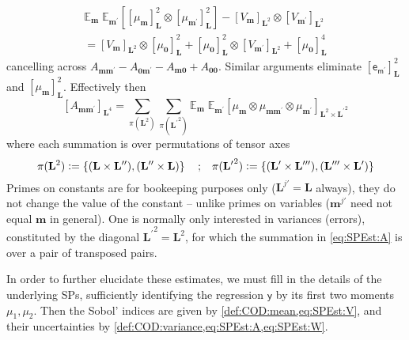 \documentclass[preprint,12pt]{elsarticle}
\newcommand*{\M}[1]{\ensuremath{#1}\xspace}
\newcommand*{\x}{\times}
\newcommand*{\mi}[1]{\mathbf{#1}}
\newcommand*{\rv}[1]{\mathsf{#1}}
\newcommand*{\te}[2][]{\left\lbrack{#2}\right\rbrack_{#1}}
\newcommand*{\deq}{\M{\mathrel{\mathop:}=}}
\newcommand{\T}[1]{\text{#1}}
\newcommand*{\QT}[2][]{\M{\quad\T{#2}\ifthenelse{\equal{#1}{}}{\quad}{#1}}}
\newcommand*{\ev}[3][]{\mathbb{E}_{#3}^{#1}\!\left\lbrack{#2}\right\rbrack}
\newcommand*{\evt}[3][]{\mathbb{E}_{#3}^{#1}\!#2}
\newcommand*{\set}[1]{\M{\left\lbrace{#1}\right\rbrace}}
\begin{document}
    \begin{multline*}
        \evt{\;\ev{\te[\mi{L}]{\mu_{\mi{m}}}^{2} \otimes \te[\mi{L}]{\mu_{\mi{m^{\prime}}}}^{2}}{\mi{m^{\prime}}}}{\mi{m}}
        - \te[\mi{L}^2]{V_{\mi{m}}}\otimes \te[\mi{L}^2]{V_{\mi{m^{\prime}}}} \\
        = \te[\mi{L}^2]{V_{\mi{m}}}\otimes \te[\mi{L}]{\mu_{\mi{0}}}^{2}
        + \te[\mi{L}]{\mu_{\mi{0}}}^{2}\otimes \te[\mi{L}^2]{V_{\mi{m^{\prime}}}}
        + \te[\mi{L}]{\mu_{\mi{0}}}^{4}
    \end{multline*}
    cancelling across $A_{\mi{mm^{\prime}}}-A_{\mi{0m^{\prime}}} - A_{\mi{m0}}+A_{\mi{00}}$.
    Similar arguments eliminate $\te[\mi{L}]{\rv{e_{m^{\prime}}}}^{2}$ and $\te[\mi{L}]{\mu_{\mi{m}}}^{2}$.
    Effectively then
    \begin{equation}\label{eq:SPEst:A}
        \te[\mi{L}^4]{A_{\mi{mm^{\prime}}}} = \sum_{\pi(\mi{L}^{2})} \sum_{\pi(\mi{L^{\prime}}^{2})}
        \evt{\;\evt{\te[\mi{L}^{2} \x \mi{L^{\prime}}^{2}]{\mu_{\mi{m}} \otimes \mu_{\mi{mm^{\prime}}} \otimes \mu_{\mi{m^{\prime}}}}}{\mi{m^{\prime}}}}{\mi{m}}
    \end{equation}
    where each summation is over permutations of tensor axes
    \begin{equation*}
        \pi(\mi{L}^{2}) \deq \set{(\mi{L}\x\mi{L^{\prime\prime}}), (\mi{L^{\prime\prime}}\x\mi{L})} \QT{;} \pi(\mi{L^{\prime}}^{2}) \deq \set{(\mi{L^{\prime}}\x\mi{L^{\prime\prime\prime}}), (\mi{L^{\prime\prime\prime}}\x\mi{L^{\prime}})}
    \end{equation*}
    Primes on constants are for bookeeping purposes only ($\mi{L}^{j\prime} = \mi{L}$ always), they do not change the value of the constant -- unlike primes on variables ($\mi{m}^{j\prime}$ need not equal $\mi{m}$ in general). One is normally only interested in variances (errors), constituted by the diagonal $\mi{L^{\prime}}^{2}=\mi{L}^{2}$, for which the summation in \cref{eq:SPEst:A} is over a pair of transposed pairs.

    In order to further elucidate these estimates, we must fill in the details of the underlying SPs, sufficiently identifying the regression $\rv{y}$ by its first two moments $\mu_{1}, \mu_{2}$. Then the Sobol' indices are given by \cref{def:COD:mean,eq:SPEst:V}, and their uncertainties by \cref{def:COD:variance,eq:SPEst:A,eq:SPEst:W}.
\end{document}
